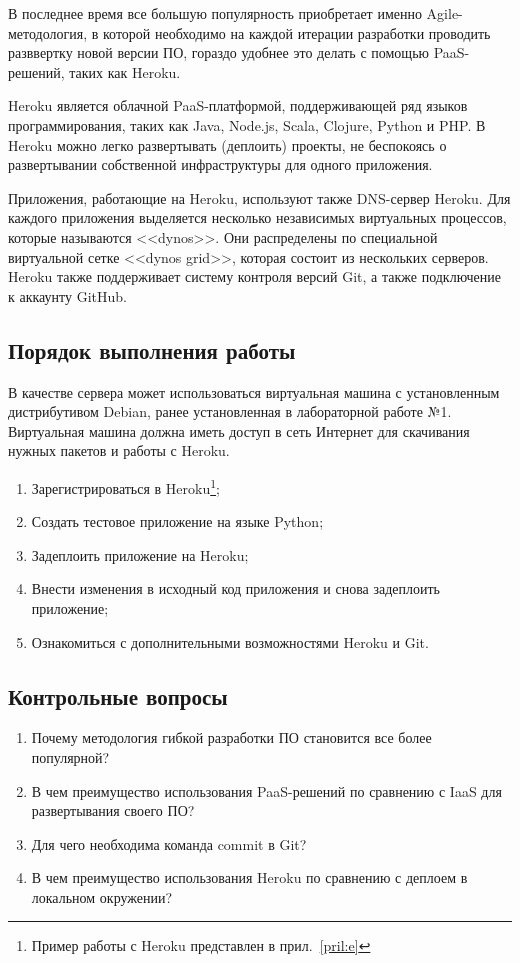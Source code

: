 В последнее время все большую популярность приобретает именно Agile-методология, в которой необходимо на каждой итерации разработки проводить разввертку новой версии ПО, гораздо удобнее это делать с помощью PaaS-решений, таких как Heroku.

Heroku является облачной PaaS-платформой, поддерживающей ряд языков программирования, таких как Java, Node.js, Scala, Clojure, Python и PHP.
В Heroku можно легко развертывать (деплоить) проекты, не беспокоясь о развертывании собственной инфраструктуры для одного приложения.

Приложения, работающие на Heroku, используют также DNS-сервер Heroku.
Для каждого приложения выделяется несколько независимых виртуальных процессов, которые называются <<dynos>>.
Они распределены по специальной виртуальной сетке <<dynos grid>>, которая состоит из нескольких серверов.
Heroku также поддерживает систему контроля версий Git, а также подключение к аккаунту GitHub.

\subsection{Порядок выполнения работы}

В качестве сервера может использоваться виртуальная машина с установленным дистрибутивом Debian, ранее установленная в лабораторной работе №1.
Виртуальная машина должна иметь доступ в сеть Интернет для скачивания нужных пакетов и работы с Heroku.

\begin{enumerate}
    \item Зарегистрироваться в Heroku\footnote{Пример работы с Heroku представлен в прил.~\ref{pril:e}};
    \item Создать тестовое приложение на языке Python;
    \item Задеплоить приложение на Heroku;
    \item Внести изменения в исходный код приложения и снова задеплоить приложение;
    \item Ознакомиться с дополнительными возможностями Heroku и Git.
\end{enumerate}

\subsection{Контрольные вопросы}
\begin{enumerate}
    \item Почему методология гибкой разработки ПО становится все более популярной?
    \item В чем преимущество использования PaaS-решений по сравнению с IaaS для развертывания своего ПО?
    \item Для чего необходима команда commit в Git?
    \item В чем преимущество использования Heroku по сравнению с деплоем в локальном окружении?
\end{enumerate}

\clearpage
